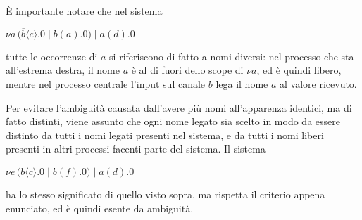 \`E importante notare che nel sistema

\begin{pilisting}
$
    \nu a \, (
      \overline{b}\langle c\rangle.0 \; | \;
      b(a).0
    ) \; | \;
    a(d).0
$
\end{pilisting}

tutte le occorrenze di $a$ si riferiscono di fatto a nomi diversi: nel
processo che sta all'estrema destra, il nome $a$ \`e al di fuori dello
scope di $\nu a$, ed \`e quindi libero, mentre nel processo centrale
l'input sul canale $b$ lega il nome $a$ al valore ricevuto.

Per evitare l'ambiguit\`a causata dall'avere pi\`u nomi all'apparenza
identici, ma di fatto distinti, viene assunto che ogni nome legato sia
scelto in modo da essere distinto da tutti i nomi legati presenti nel
sistema, e da tutti i nomi liberi presenti in altri processi facenti parte
del sistema. Il sistema

\begin{pilisting}
$
    \nu e \, (
      \overline{b}\langle c\rangle.0 \; | \;
      b(f).0
    ) \; | \;
    a(d).0
$
\end{pilisting}

ha lo stesso significato di quello visto sopra, ma rispetta il criterio
appena enunciato, ed \`e quindi esente da ambiguit\`a.
